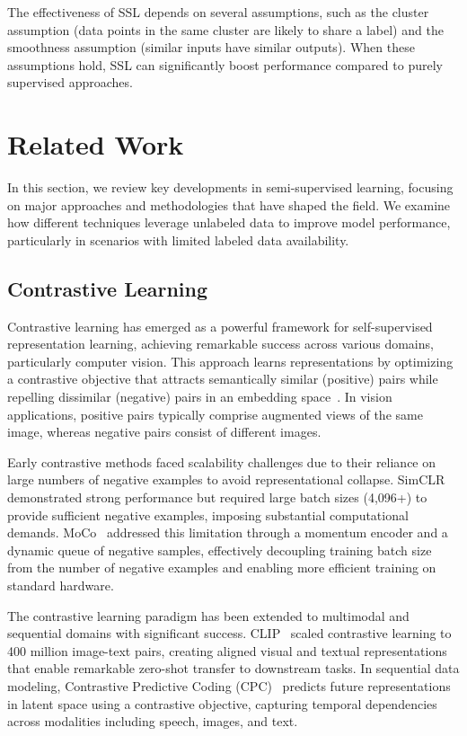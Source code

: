 The effectiveness of SSL depends on several assumptions, such as the cluster assumption (data points in the same cluster are likely to share a label) and the smoothness assumption (similar inputs have similar outputs). When these assumptions hold, SSL can significantly boost performance compared to purely supervised approaches.

\section{Related Work}
In this section, we review key developments in semi-supervised learning, focusing on major approaches and methodologies that have shaped the field. We examine how different techniques leverage unlabeled data to improve model performance, particularly in scenarios with limited labeled data availability.

\subsection{Contrastive Learning}

Contrastive learning has emerged as a powerful framework for self-supervised representation learning, achieving remarkable success across various domains, particularly computer vision. This approach learns representations by optimizing a contrastive objective that attracts semantically similar (positive) pairs while repelling dissimilar (negative) pairs in an embedding space~\cite{chen2020simple}. In vision applications, positive pairs typically comprise augmented views of the same image, whereas negative pairs consist of different images.

Early contrastive methods faced scalability challenges due to their reliance on large numbers of negative examples to avoid representational collapse. SimCLR~\cite{chen2020simple} demonstrated strong performance but required large batch sizes (4,096+) to provide sufficient negative examples, imposing substantial computational demands. MoCo~\cite{he2020momentum} addressed this limitation through a momentum encoder and a dynamic queue of negative samples, effectively decoupling training batch size from the number of negative examples and enabling more efficient training on standard hardware.

The contrastive learning paradigm has been extended to multimodal and sequential domains with significant success. CLIP~\cite{radford2021learning} scaled contrastive learning to 400 million image-text pairs, creating aligned visual and textual representations that enable remarkable zero-shot transfer to downstream tasks. In sequential data modeling, Contrastive Predictive Coding (CPC)~\cite{oord2018representation} predicts future representations in latent space using a contrastive objective, capturing temporal dependencies across modalities including speech, images, and text.

